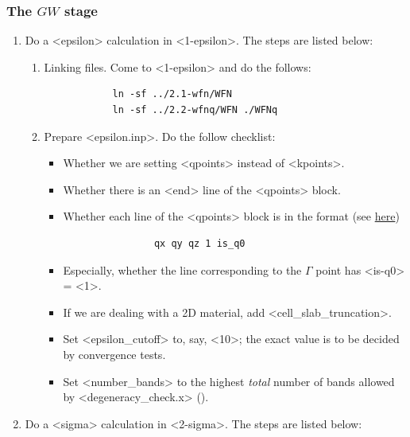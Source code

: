 \documentclass[hyperref, a4paper]{report}
\def\texttt#1{<#1>}%
\newcommand{\shortcode}[1]{\texttt{#1}}
\begin{document}
\subsubsection{The $GW$ stage}

\begin{enumerate}
    \item Do a \shortcode{epsilon} calculation in \shortcode{1-epsilon}. The steps are listed below:
    \begin{enumerate}
        \item Linking files. 
        Come to \shortcode{1-epsilon} and do the follows:
        \begin{lstlisting}
            ln -sf ../2.1-wfn/WFN
            ln -sf ../2.2-wfnq/WFN ./WFNq
        \end{lstlisting}
        \item Prepare \shortcode{epsilon.inp}. Do the follow checklist:
        \begin{itemize}
            \item Whether we are setting \shortcode{qpoints} instead of \shortcode{kpoints}.
            \item Whether there is an \shortcode{end} line of the \shortcode{qpoints} block.
            \item Whether each line of the \shortcode{qpoints} block is in the format
            (see \href{http://manual.berkeleygw.org/3.0/epsilon-keywords/#qpoints}{here})
            \begin{lstlisting}
                qx qy qz 1 is_q0
            \end{lstlisting}
            \item Especially, whether the line corresponding to the $\Gamma$ point
            has \shortcode{is-q0} = \shortcode{1}.
            \item If we are dealing with a 2D material, add \shortcode{cell_slab_truncation}.
            \item Set \shortcode{epsilon_cutoff} to, say, \shortcode{10}; 
            the exact value is to be decided by convergence tests.
            \item Set \shortcode{number_bands} to the highest \emph{total} number of bands 
            allowed by \shortcode{degeneracy_check.x} (). 
        \end{itemize}
    \end{enumerate}
    \item Do a \shortcode{sigma} calculation in \shortcode{2-sigma}. The steps are listed below:

\end{enumerate}
\end{document}

